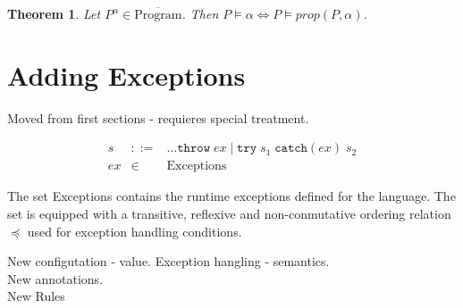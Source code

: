 \documentclass[10pt,notitlepage,twoside]{article}
\newcommand{\exc}{\mathit{ex}}
\newtheorem{theorem}{Theorem}
\begin{document}
\begin{theorem}
Let $P^\alpha \in \overline{\textrm{Program}}$. Then 
$P \models \alpha \Leftrightarrow P \models \mathit{prop}(P,\alpha)$.
\end{theorem}


\section{Adding Exceptions}\label{sec:exceptions}

Moved from first sections - requieres special treatment.

\begin{displaymath}
\begin{array}{rcl}
s & ::= & \ldots
    \texttt{throw}\; \exc \mid \texttt{try}\;s_1\;\texttt{catch}(\exc)\; s_2   \\
\exc & \in & \textrm{Exceptions}
\end{array}
\end{displaymath}

The set \textrm{Exceptions} contains the runtime exceptions defined for the language. The set is equipped with a transitive, reflexive and non-conmutative ordering relation $\preceq$ used for exception handling conditions.

New configutation - value.
Exception hangling - semantics. \\
New annotations. \\
New Rules\\







\end{document}
